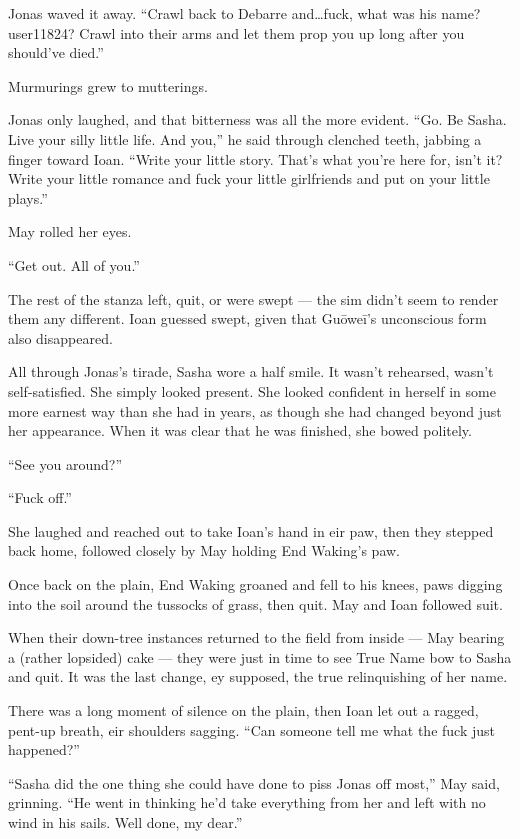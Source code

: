 Jonas waved it away. ``Crawl back to Debarre and\ldots fuck, what was his name? user11824? Crawl into their arms and let them prop you up long after you should've died.''

Murmurings grew to mutterings.

Jonas only laughed, and that bitterness was all the more evident. ``Go. Be Sasha. Live your silly little life. And you,'' he said through clenched teeth, jabbing a finger toward Ioan. ``Write your little story. That's what you're here for, isn't it? Write your little romance and fuck your little girlfriends and put on your little plays.''

May rolled her eyes.

``Get out. All of you.''

The rest of the stanza left, quit, or were swept — the sim didn't seem to render them any different. Ioan guessed swept, given that Guōweī's unconscious form also disappeared.

All through Jonas's tirade, Sasha wore a half smile. It wasn't rehearsed, wasn't self-satisfied. She simply looked present. She looked confident in herself in some more earnest way than she had in years, as though she had changed beyond just her appearance. When it was clear that he was finished, she bowed politely.

``See you around?''

``Fuck off.''

She laughed and reached out to take Ioan's hand in eir paw, then they stepped back home, followed closely by May holding End Waking's paw.

Once back on the plain, End Waking groaned and fell to his knees, paws digging into the soil around the tussocks of grass, then quit. May and Ioan followed suit.

When their down-tree instances returned to the field from inside — May bearing a (rather lopsided) cake — they were just in time to see True Name bow to Sasha and quit. It was the last change, ey supposed, the true relinquishing of her name.

There was a long moment of silence on the plain, then Ioan let out a ragged, pent-up breath, eir shoulders sagging. ``Can someone tell me what the fuck just happened?''

``Sasha did the one thing she could have done to piss Jonas off most,'' May said, grinning. ``He went in thinking he'd take everything from her and left with no wind in his sails. Well done, my dear.''

